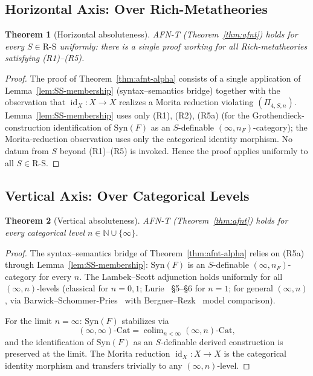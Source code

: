 \documentclass[11pt]{article}
\theoremstyle{plain}
\newtheorem{theorem}{Theorem}[section]
\theoremstyle{definition}
\newcommand{\RS}{\mathrm{R\text{-}S}}
\newcommand{\Cat}{\mathrm{Cat}}
\newcommand{\Syn}{\mathrm{Syn}}
\DeclareMathOperator{\colim}{colim}
\DeclareMathOperator{\id}{id}
\begin{document}
\subsection{Horizontal Axis: Over Rich-Metatheories}

\begin{theorem}[Horizontal absoluteness]\label{thm:horizontal}
AFN-T (Theorem~\ref{thm:afnt}) holds for every $S \in \RS$ uniformly: there is a single proof working for all Rich-metatheories satisfying (R1)--(R5).
\end{theorem}

\begin{proof}
The proof of Theorem~\ref{thm:afnt-alpha} consists of a single application of Lemma~\ref{lem:SS-membership} (syntax--semantics bridge) together with the observation that $\id_X : X \to X$ realizes a Morita reduction violating $(\Pi_{4, S, n})$. Lemma~\ref{lem:SS-membership} uses only (R1), (R2), (R5a) (for the Grothendieck-construction identification of $\Syn(F)$ as an $S$-definable $(\infty, n_F)$-category); the Morita-reduction observation uses only the categorical identity morphism. No datum from $S$ beyond (R1)--(R5) is invoked. Hence the proof applies uniformly to all $S \in \RS$.
\end{proof}

\subsection{Vertical Axis: Over Categorical Levels}

\begin{theorem}[Vertical absoluteness]\label{thm:vertical}
AFN-T (Theorem~\ref{thm:afnt}) holds for every categorical level $n \in \mathbb{N} \cup \{\infty\}$.
\end{theorem}

\begin{proof}
The syntax--semantics bridge of Theorem~\ref{thm:afnt-alpha} relies on (R5a) through Lemma~\ref{lem:SS-membership}: $\Syn(F)$ is an $S$-definable $(\infty, n_F)$-category for every $n$. The Lambek--Scott adjunction holds uniformly for all $(\infty, n)$-levels (classical for $n = 0, 1$; Lurie~\cite{LurieHTT} \S 5--\S 6 for $n = 1$; for general $(\infty, n)$, via Barwick--Schommer-Pries~\cite{BarwickSchommerPries2021} with Bergner--Rezk~\cite{BergnerRezk2013} model comparison).

For the limit $n = \infty$: $\Syn(F)$ stabilizes via
\[ (\infty, \infty)\text{-}\Cat = \colim_{n < \infty} (\infty, n)\text{-}\Cat, \]
and the identification of $\Syn(F)$ as an $S$-definable derived construction is preserved at the limit. The Morita reduction $\id_X : X \to X$ is the categorical identity morphism and transfers trivially to any $(\infty, n)$-level.
\end{proof}
\end{document}
